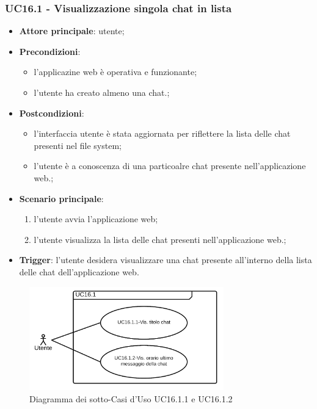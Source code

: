 \documentclass[10pt, a4paper]{article}
\begin{document}
    \subsubsection{UC16.1 - Visualizzazione singola chat in lista}
    \begin{itemize}
        \item \textbf{Attore principale}: utente;
        \item \textbf{Precondizioni}: 
        \begin{itemize}
            \item l'applicazine web è operativa e funzionante;
            \item l'utente ha creato almeno una chat.;
        \end{itemize}
        \item \textbf{Postcondizioni}: 
        \begin{itemize}
            \item l'interfaccia utente è stata aggiornata per riflettere la lista delle chat presenti nel file system;
            \item l'utente è a conoscenza di una particoalre chat presente nell'applicazione web.;
        \end{itemize}
        \item \textbf{Scenario principale}:
            \begin{enumerate}
                \item l'utente avvia l'applicazione web;
                \item l'utente visualizza la lista delle chat presenti nell'applicazione web.;
            \end{enumerate}
        \item \textbf{Trigger}: l'utente desidera visualizzare una chat presente all'interno della lista delle chat dell'applicazione web.
    \end{itemize}

    \begin{figure}[h]
        \centering
        \includegraphics[width=0.75\textwidth, height=0.75\textheight, keepaspectratio]{UC-images/UC16.1.1-UC16.1.2.png}
        \caption{Diagramma dei sotto-Casi d'Uso UC16.1.1 e UC16.1.2}
    \end{figure}
    
\end{document}
